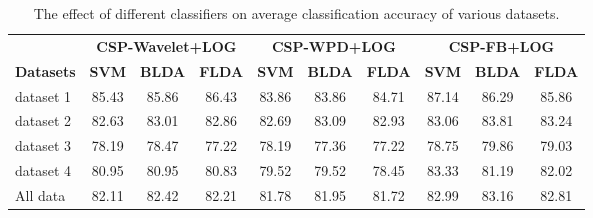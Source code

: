 \begin{table}[htbp]
\centering
\small
\caption{The effect of different classifiers on average classification accuracy of various datasets.}
\label{tab:table9_classifiers}
\begin{tabular}{lccccccccc}
\toprule
 & \multicolumn{3}{c}{\textbf{CSP-Wavelet+LOG}} & \multicolumn{3}{c}{\textbf{CSP-WPD+LOG}} & \multicolumn{3}{c}{\textbf{CSP-FB+LOG}} \\
\cmidrule(lr){2-4} \cmidrule(lr){5-7} \cmidrule(lr){8-10}
\textbf{Datasets} & \textbf{SVM} & \textbf{BLDA} & \textbf{FLDA} & \textbf{SVM} & \textbf{BLDA} & \textbf{FLDA} & \textbf{SVM} & \textbf{BLDA} & \textbf{FLDA} \\
\midrule
dataset 1 & 85.43 & 85.86 & 86.43 & 83.86 & 83.86 & 84.71 & 87.14 & 86.29 & 85.86 \\
dataset 2 & 82.63 & 83.01 & 82.86 & 82.69 & 83.09 & 82.93 & 83.06 & 83.81 & 83.24 \\
dataset 3 & 78.19 & 78.47 & 77.22 & 78.19 & 77.36 & 77.22 & 78.75 & 79.86 & 79.03 \\
dataset 4 & 80.95 & 80.95 & 80.83 & 79.52 & 79.52 & 78.45 & 83.33 & 81.19 & 82.02 \\
\midrule
All data & 82.11 & 82.42 & 82.21 & 81.78 & 81.95 & 81.72 & 82.99 & 83.16 & 82.81 \\
\bottomrule
\end{tabular}
\end{table}
